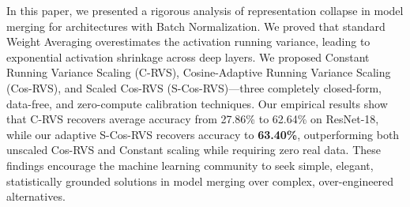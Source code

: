 \documentclass{article}
\theoremstyle{plain}
\theoremstyle{definition}
\theoremstyle{remark}
\begin{document}
In this paper, we presented a rigorous analysis of representation collapse in model merging for architectures with Batch Normalization. We proved that standard Weight Averaging overestimates the activation running variance, leading to exponential activation shrinkage across deep layers. We proposed Constant Running Variance Scaling (C-RVS), Cosine-Adaptive Running Variance Scaling (Cos-RVS), and Scaled Cos-RVS (S-Cos-RVS)—three completely closed-form, data-free, and zero-compute calibration techniques. Our empirical results show that C-RVS recovers average accuracy from 27.86\% to 62.64\% on ResNet-18, while our adaptive S-Cos-RVS recovers accuracy to \textbf{63.40\%}, outperforming both unscaled Cos-RVS and Constant scaling while requiring zero real data. These findings encourage the machine learning community to seek simple, elegant, statistically grounded solutions in model merging over complex, over-engineered alternatives.

\nocite{*}


\end{document}
